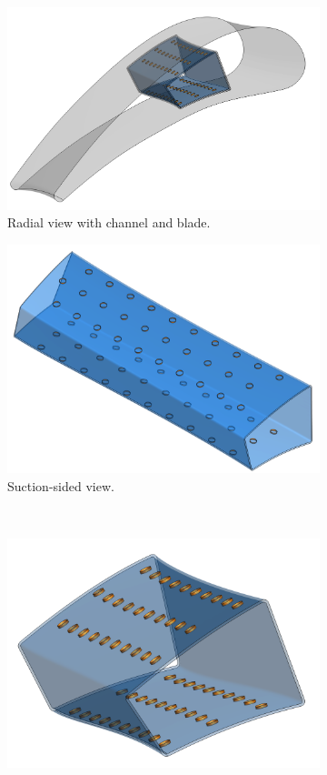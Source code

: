 \documentclass[a4paper, 11pt]{report}
\theoremstyle{definition}
\begin{document}
	\begin{figure}[H]
		\centering
		\begin{subfigure}{.37\textwidth}
			\includegraphics[width=\textwidth]{../tec/impingement/00.png}
			\caption{Radial view with channel and blade.}
		\end{subfigure}
		\begin{subfigure}{.37\textwidth}
			\includegraphics[width=\textwidth]{../tec/impingement/02.png}
			\caption{Suction-sided view.}
		\end{subfigure}\\
		\begin{subfigure}{.5\textwidth}
			\includegraphics[width=\textwidth]{../tec/impingement/01.png}

\end{subfigure}
\end{figure}
\end{document}
